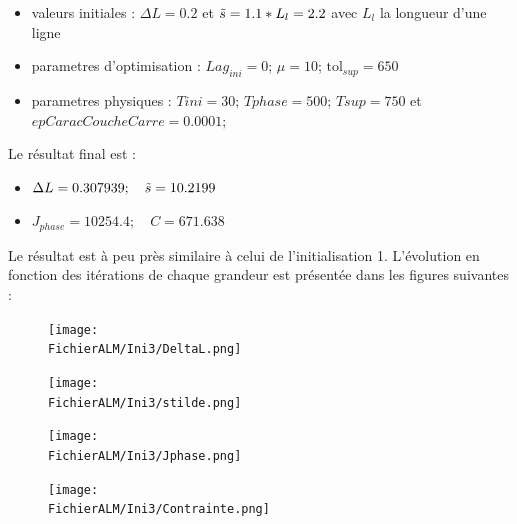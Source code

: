 \documentclass[11pt,a4paper]{article}
\begin{document}
\begin{itemize}
	\item valeurs initiales : $\Delta L=0.2$ et $\tilde{s}=1.1*L_l=2.2$ avec $L_l$ la longueur d'une ligne
	\item parametres d'optimisation : $Lag_{ini}=0$; $\mu=10$; $\textrm{tol}_{sup}=650$
	\item parametres physiques : $Tini=30;\,Tphase=500;\,Tsup=750$ et $epCaracCoucheCarre=0.0001;$
\end{itemize}

Le résultat final est :
\begin{itemize}
	\item $\Delta L= 0.307939 ;\quad \tilde{s}=10.2199$
	\item $J_{phase}=10254.4;\quad C= 671.638$
\end{itemize}

Le résultat est à peu près similaire à celui de l'initialisation 1.
L'évolution en fonction des itérations de chaque grandeur est présentée dans les figures suivantes :

\begin{figure}[H]
	\begin{minipage}{0.45\textwidth}
		\centering
		\texttt{[image: \\FichierALM/Ini3/DeltaL.png]}
	\end{minipage}
	\begin{minipage}{0.45\textwidth}
		\centering
		\texttt{[image: \\FichierALM/Ini3/stilde.png]}
	\end{minipage}	
\end{figure}

\begin{figure}[H]
	\begin{minipage}{0.45\textwidth}
		\centering
		\texttt{[image: \\FichierALM/Ini3/Jphase.png]}
	\end{minipage}
	\begin{minipage}{0.45\textwidth}
		\centering
		\texttt{[image: \\FichierALM/Ini3/Contrainte.png]}
	\end{minipage}	
\end{figure}

\setcounter{x}{0}
\end{document}
